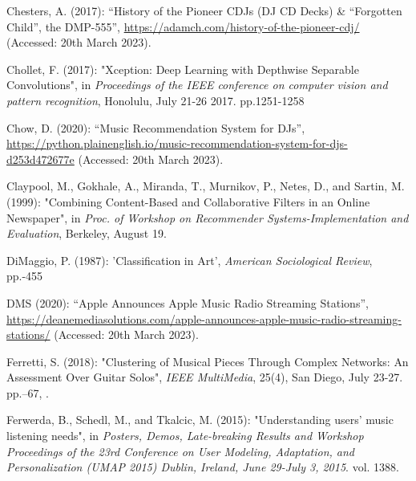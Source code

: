 \documentclass[11pt,titlepage,oneside]{book}
\begin{document}
\begin{thebibliography}{97}
	Chesters, A. (2017): \enquote{History of the {Pioneer} {CDJs} ({DJ} {CD}
		{Decks}) \& “{Forgotten} {Child}”, the {DMP}-555},
	\urlprefix\url{https://adamch.com/history-of-the-pioneer-cdj/} (Accessed: 20th March 2023).
	
	Chollet, F. (2017): "Xception: {Deep} {Learning} with {Depthwise}
		{Separable} {Convolutions}", in \textit{Proceedings of the IEEE conference on computer vision and pattern recognition}, Honolulu, July 21-26 2017. pp.1251-1258 
	
	Chow, D. (2020): \enquote{Music {Recommendation} {System} for {DJs}},
	\urlprefix\url{https://python.plainenglish.io/music-recommendation-system-for-djs-d253d472677e} (Accessed: 20th March 2023).
	
	Claypool, M., Gokhale, A., Miranda, T., Murnikov, P., Netes, D., and Sartin, M.
	(1999): "Combining {Content}-{Based} and {Collaborative} {Filters} in
		an {Online} {Newspaper}", in \textit{Proc. of Workshop on Recommender Systems-Implementation and Evaluation}, Berkeley, August 19.
	
	DiMaggio, P. (1987): 'Classification in {Art}', \textit{American
		Sociological Review}, pp.-455
	
	DMS (2020): \enquote{Apple {Announces} {Apple} {Music} {Radio} {Streaming}
		{Stations}},
	\urlprefix\url{https://deanemediasolutions.com/apple-announces-apple-music-radio-streaming-stations/} (Accessed: 20th March 2023).
	
	Ferretti, S. (2018): "Clustering of {Musical} {Pieces} {Through}
		{Complex} {Networks}: {An} {Assessment} {Over} {Guitar} {Solos}",
	\textit{IEEE MultiMedia}, 25(4), San Diego, July 23-27. pp.--67,
	.
	
	Ferwerda, B., Schedl, M., and Tkalcic, M. (2015): "Understanding users' music listening needs", in \textit{Posters, {Demos}, {Late}-breaking {Results} and {Workshop}
		{Proceedings} of the 23rd {Conference} on {User} {Modeling}, {Adaptation},
		and {Personalization} ({UMAP} 2015) {Dublin}, {Ireland}, {June} 29-{July} 3,
		2015}. vol. 1388.
	

\end{thebibliography}
\end{document}
